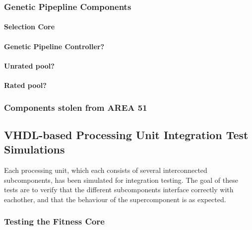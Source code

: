 \subsubsection{Genetic Pipepline Components}
\paragraph{Selection Core}
\paragraph{Genetic Pipeline Controller?}
\paragraph{Unrated pool?}
\paragraph{Rated pool?}








\subsubsection{Components stolen from AREA 51}

\subsection{\gls{VHDL}-based Processing Unit Integration Test Simulations}

Each processing unit, which each consists of several interconnected subcomponents, has been simulated for integration testing.
The goal of these tests are to verify that the different subcomponents interface correctly with eachother, and that the behaviour of the supercomponent is as expected.

\subsubsection{Testing the Fitness Core}

